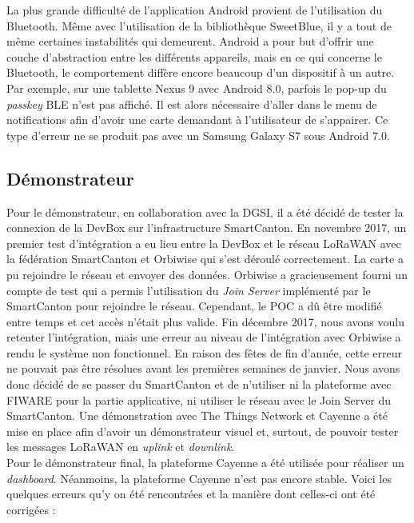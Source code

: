 La plus grande difficulté de l'application Android provient de l'utilisation du Bluetooth. Même avec l'utilisation de la bibliothèque SweetBlue, il y a tout de même certaines instabilités qui demeurent. Android a pour but d'offrir une couche d'abstraction entre les différents appareils, mais en ce qui concerne le Bluetooth, le comportement diffère encore beaucoup d'un dispositif à un autre. Par exemple, sur une tablette Nexus 9 avec Android 8.0, parfois le pop-up du \textit{passkey} BLE n'est pas affiché. Il est alors nécessaire d'aller dans le menu de notifications afin d'avoir une carte demandant à l'utilisateur de s'appairer. Ce type d'erreur ne se produit pas avec un Samsung Galaxy S7 sous Android 7.0.

\subsection{Démonstrateur}


Pour le démonstrateur, en collaboration avec la DGSI, il a été décidé de tester la connexion de la DevBox sur l'infrastructure SmartCanton. En novembre 2017, un premier test d'intégration a eu lieu entre la DevBox et le réseau LoRaWAN avec la fédération SmartCanton et Orbiwise qui s'est déroulé correctement. La carte a pu rejoindre le réseau et envoyer des données. Orbiwise a gracieusement fourni un compte de test  qui a permis l'utilisation du \textit{Join Server} implémenté par le SmartCanton pour rejoindre le réseau. Cependant, le POC a dû être modifié entre temps et cet accès n'était plus valide. Fin décembre 2017, nous avons voulu retenter l'intégration, mais une erreur au niveau de l'intégration avec Orbiwise a rendu le système non fonctionnel. En raison des fêtes de fin d'année, cette erreur ne pouvait pas être résolues avant les premières semaines de janvier. Nous avons donc décidé de se passer du SmartCanton et de n'utiliser ni la plateforme avec FIWARE pour la partie applicative, ni utiliser le réseau avec le Join Server du SmartCanton. Une démonstration avec The Things Network et Cayenne a été mise en place afin d'avoir un démonstrateur visuel et, surtout, de pouvoir tester les messages LoRaWAN en \textit{uplink} et \textit{downlink}.\\


Pour le démonstrateur final, la plateforme Cayenne a été utilisée pour réaliser un \textit{dashboard}. Néanmoins, la plateforme Cayenne n'est pas encore stable. Voici les quelques erreurs qu'y on été rencontrées et la manière dont celles-ci ont été corrigées : 


